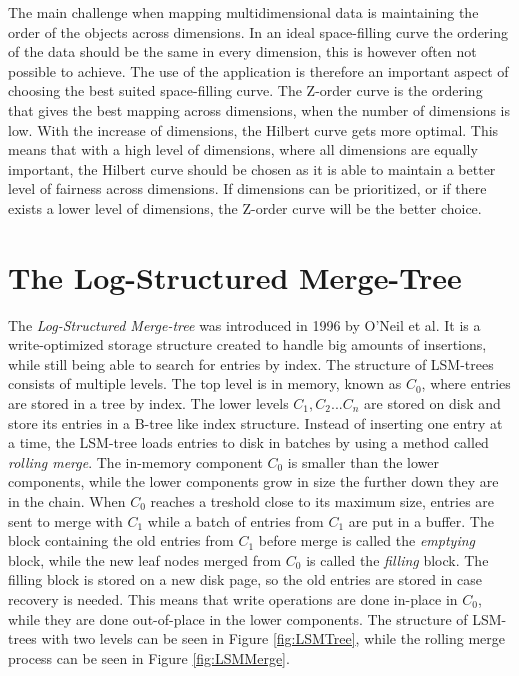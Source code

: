 \noindent
The main challenge when mapping multidimensional data is maintaining the order of the objects across dimensions. In an ideal space-filling curve the ordering of the data should be the same in every dimension, this is however often not possible to achieve. The use of the application is therefore an important aspect of choosing the best suited space-filling curve. The Z-order curve is the ordering that gives the best mapping across dimensions, when the number of dimensions is low. With the increase of dimensions, the Hilbert curve gets more optimal\cite{IrregularSpace}. This means that with a high level of dimensions, where all dimensions are equally important, the Hilbert curve should be chosen as it is able to maintain a better level of fairness across dimensions. If dimensions can be prioritized, or if there exists a lower level of dimensions, the Z-order curve will be the better choice.

\section{The Log-Structured Merge-Tree}
The \emph{Log-Structured Merge-tree} was introduced in 1996 by O'Neil et al\cite{LSMTree}. It is a write-optimized storage structure created to handle big amounts of insertions, while still being able to search for entries by index. The structure of LSM-trees consists of multiple levels. The top level is in memory, known as $C_0$, where entries are stored in a tree by index. The lower levels $C_1, C_2 ... C_n$ are stored on disk and store its entries in a B-tree like index structure. Instead of inserting one entry at a time, the LSM-tree loads entries to disk in batches by using a method called \emph{rolling merge}. The in-memory component $C_0$ is smaller than the lower components, while the lower components grow in size the further down they are in the chain. When $C_0$ reaches a treshold close to its maximum size, entries are sent to merge with $C_1$ while a batch of entries from $C_1$ are put in a buffer. The block containing the old entries from $C_1$ before merge is called the \emph{emptying} block, while the new leaf nodes merged from $C_0$ is called the \emph{filling} block. The filling block is stored on a new disk page, so the old entries are stored in case recovery is needed. This means that write operations are done in-place in $C_0$, while they are done out-of-place in the lower components. The structure of LSM-trees with two levels can be seen in Figure \ref{fig:LSMTree}, while the rolling merge process can be seen in Figure \ref{fig:LSMMerge}. 

